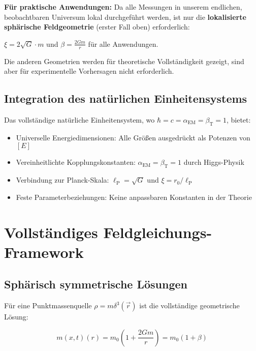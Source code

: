 \documentclass[12pt,a4paper]{article}
\newcommand{\mfield}{m(x,t)}
\newcommand{\lP}{\ell_{\text{P}}}
\theoremstyle{definition}
\theoremstyle{remark}
\begin{document}
	\begin{tcolorbox}[colback=yellow!5!white,colframe=orange!75!black,title=Praktische Vereinfachungsnotiz]
		\textbf{Für praktische Anwendungen:} Da alle Messungen in unserem endlichen, beobachtbaren Universum lokal durchgeführt werden, ist nur die \textbf{lokalisierte sphärische Feldgeometrie} (erster Fall oben) erforderlich:
		
		$\xi = 2\sqrt{G} \cdot m$ und $\beta = \frac{2Gm}{r}$ für alle Anwendungen.
		
		Die anderen Geometrien werden für theoretische Vollständigkeit gezeigt, sind aber für experimentelle Vorhersagen nicht erforderlich.
	\end{tcolorbox}
	
	\subsection{Integration des natürlichen Einheitensystems}
	\label{subsec:nat_einheiten_integration}
	
	Das vollständige natürliche Einheitensystem, wo $\hbar = c = \alpha_{\text{EM}} = \beta_{\text{T}} = 1$, bietet:
	\begin{itemize}
		\item Universelle Energiedimensionen: Alle Größen ausgedrückt als Potenzen von $[E]$
		\item Vereinheitlichte Kopplungskonstanten: $\alpha_{\text{EM}} = \beta_{\text{T}} = 1$ durch Higgs-Physik
		\item Verbindung zur Planck-Skala: $\lP = \sqrt{G}$ und $\xi = r_0/\lP$
		\item Feste Parameterbeziehungen: Keine anpassbaren Konstanten in der Theorie
	\end{itemize}
	
	\section{Vollständiges Feldgleichungs-Framework}
	\label{sec:feldgleichungs_framework}
	
	\subsection{Sphärisch symmetrische Lösungen}
	\label{subsec:sphaerische_loesungen}
	
	Für eine Punktmassenquelle $\rho = m \delta^3(\vec{r})$ ist die vollständige geometrische Lösung:
	
	\begin{equation}
		\mfield(r) = m_0\left(1 + \frac{2Gm}{r}\right) = m_0(1 + \beta)
		\label{eq:massenfeld_loesung}
	\end{equation}
	
\end{document}
